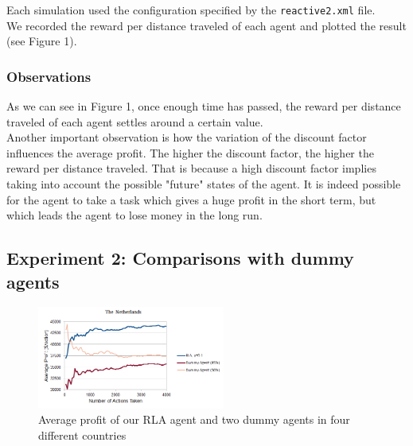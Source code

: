 \documentclass[11pt]{article}
\begin{document}
Each simulation used the configuration specified by the \texttt{reactive2.xml} file.\\

We recorded the reward per distance traveled of each agent and plotted the result (see Figure 1).\\


\subsubsection{Observations}
As we can see in Figure 1, once enough time has passed, the reward per distance traveled of each agent settles around a certain value.\\

Another important observation is how the variation of the discount factor influences the average profit. The higher the discount factor, the higher the reward per distance traveled. That is because a high discount factor implies taking into account the possible "future" states of the agent. It is indeed possible for the agent to take a task which gives a huge profit in the short term, but which leads the agent to lose money in the long run.\\

\subsection{Experiment 2: Comparisons with dummy agents}
\begin{figure}
	\centering
	\includegraphics[width=0.55\textwidth]{p21}
	\caption{Average profit of our RLA agent and two dummy agents in four different countries}
	\label{figure:1}
\end{figure}
\end{document}
